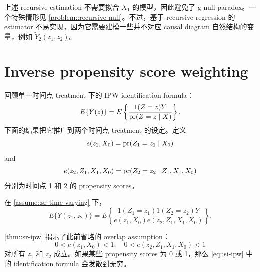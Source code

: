 上述 recursive estimation 不需要拟合 $X_1$ 的模型，因此避免了 g-null paradox。一个特殊情形见 \cref{problem::recursive-null}。不过，基于 recursive regression 的 estimator 不易实现，因为它需要建模一些并不对应 causal diagram 自然结构的变量，例如 $\tilde{Y}_2(z_1, z_2)$。




\section{Inverse propensity score weighting}\label{section::si-ipw}


回顾单一时间点 treatment 下的 IPW identification formula：
$$
E\{  Y(z) \} = E  \left\{   \frac{ 1(Z=z) Y  }{  \textup{pr}(Z=z\mid X) }  \right\}.
$$
下面的结果把它推广到两个时间点 treatment 的设定。定义
$$
e(z_1, X_0) = \textup{pr}(Z_1=z_1\mid X_0) 
$$
and
$$
e(z_2, Z_1, X_1, X_0) =  \textup{pr}(Z_2 = z_2 \mid Z_1, X_1,  X_0)
$$
分别为时间点 1 和 2 的 propensity scores。

\begin{theorem}
\label{thm::sr-ipw}
在 \cref{assume::sr-time-varying} 下，
\begin{equation}
E\{ Y(z_1, z_2) \} 
= E\left\{    \frac{  1(Z_1=z_1) 1(Z_2=z_2) Y  }{   e(z_1, X_0)  e(z_2,Z_1, X_1,  X_0)     }   \right\} .
\label{eq::si-ipw}
\end{equation}
\end{theorem}


\cref{thm::sr-ipw} 揭示了此前省略的 overlap assumption：
$$
0< e(z_1, X_0)   <1,\quad
0< e(z_2, Z_1, X_1,  X_0)   < 1
$$
对所有 $z_1$ 和 $z_2$ 成立。如果某些 propensity scores 为 0 或 1，那么 \cref{eq::si-ipw} 中的 identification formula 会发散到无穷。



